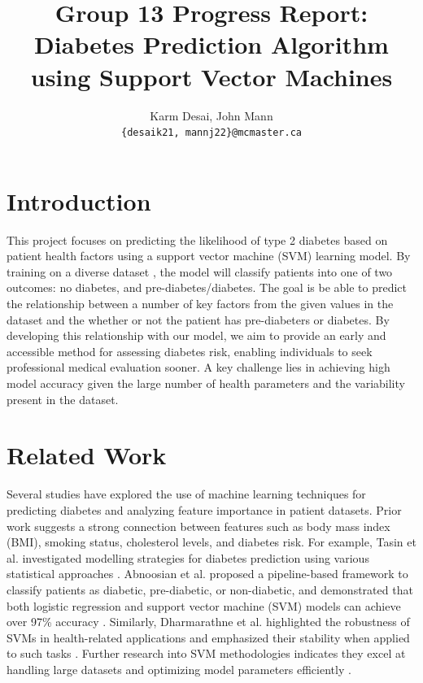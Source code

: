 \documentclass[11pt]{article}
\title{Group 13 Progress Report:\\Diabetes Prediction Algorithm using Support Vector Machines}
\author{Karm Desai, John Mann \\
  \texttt{\{desaik21, mannj22\}@mcmaster.ca} }
\begin{document}
\maketitle

\section{Introduction}

This project focuses on predicting the likelihood of type 2 diabetes based on patient health factors using a support vector machine (SVM) learning model. By training on a diverse dataset \cite{cdc}, the model will classify patients into one of two outcomes: no diabetes, and pre-diabetes/diabetes. The goal is be able to predict the relationship between a number of key factors from the given values in the dataset and the whether or not the patient has pre-diabeters or diabetes. By developing this relationship with our model, we aim to provide an early and accessible method for assessing diabetes risk, enabling individuals to seek professional medical evaluation sooner. A key challenge lies in achieving high model accuracy given the large number of health parameters and the variability present in the dataset.


\section{Related Work}

Several studies have explored the use of machine learning techniques for predicting diabetes and analyzing feature importance in patient datasets. Prior work suggests a strong connection between features such as body mass index (BMI), smoking status, cholesterol levels, and diabetes risk. For example, Tasin et al. investigated modelling strategies for diabetes prediction using various statistical approaches \cite{tasinetal}. Abnoosian et al. proposed a pipeline-based framework to classify patients as diabetic, pre-diabetic, or non-diabetic, and demonstrated that both logistic regression and support vector machine (SVM) models can achieve over 97\% accuracy \cite{abnoosianetal}. Similarly, Dharmarathne et al. highlighted the robustness of SVMs in health-related applications and emphasized their stability when applied to such tasks \cite{DHARMARATHNE2024100301}. Further research into SVM methodologies indicates they excel at handling large datasets and optimizing model parameters efficiently \cite{CERVANTES2020189}.
\end{document}
